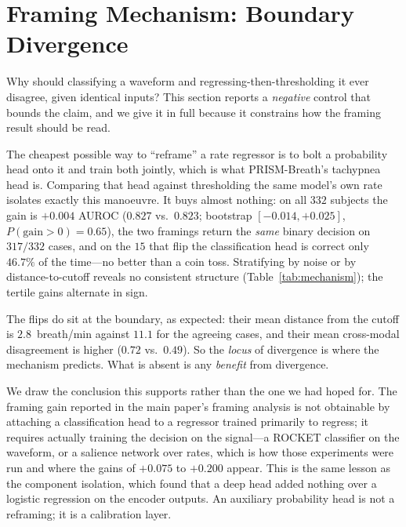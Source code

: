 \section{Framing Mechanism: Boundary Divergence}
\label{app:mechanism}
Why should classifying a waveform and regressing-then-thresholding it ever disagree, given identical inputs?
This section reports a \emph{negative} control that bounds the claim, and we give it in full because it
constrains how the framing result should be read.

The cheapest possible way to ``reframe'' a rate regressor is to bolt a probability head onto it and train
both jointly, which is what PRISM-Breath's tachypnea head is. Comparing that head against thresholding the
same model's own rate isolates exactly this manoeuvre. It buys almost nothing: on all $332$ subjects the
gain is $+0.004$ AUROC ($0.827$ vs.\ $0.823$; bootstrap $[{-}0.014,{+}0.025]$, $P(\text{gain}{>}0)=0.65$),
the two framings return the \emph{same} binary decision on $317/332$ cases, and on the $15$ that flip the
classification head is correct only $46.7\%$ of the time---no better than a coin toss. Stratifying by
noise or by distance-to-cutoff reveals no consistent structure (Table~\ref{tab:mechanism}); the tertile
gains alternate in sign.

The flips do sit at the boundary, as expected: their mean distance from the cutoff is $2.8$~breath/min
against $11.1$ for the agreeing cases, and their mean cross-modal disagreement is higher ($0.72$ vs.\
$0.49$). So the \emph{locus} of divergence is where the mechanism predicts. What is absent is any
\emph{benefit} from divergence.

We draw the conclusion this supports rather than the one we had hoped for. The framing gain reported in
the main paper's framing analysis is not obtainable by attaching a classification head to a
regressor trained primarily to regress; it requires actually training the decision on the signal---a
ROCKET classifier on the waveform, or a salience network over rates, which is how those experiments were
run and where the gains of $+0.075$ to $+0.200$ appear. This is the same lesson as the component
isolation, which found that a deep head added nothing over a logistic regression on the encoder outputs.
An auxiliary probability head is not a reframing; it is a calibration layer.

